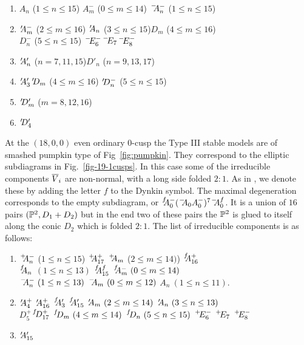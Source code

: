 \documentclass{amsart}
\begin{document}
\begin{enumerate} 
\item[($0$)] $A_n$ ($1\le n\le 15$) \quad $A_m^-$ ($0\le m\le 14$)
  \quad $\mA_n^-$ ($1\le n\le 15$)
\item[($1$)] $\pA_m^-$ ($2\le m\le 16$) \quad
  $\pA_n$ ($3\le n\le 15$)\quad $D_m$ ($4\le m\le 16$) \\
  $D^-_n$ ($5\le n\le 15$)\quad
  $\mE_6^-$\quad $\mE_7$\quad $\mE_8^-$
\item[($1+1$)] $\pA'_n$ ($n=7,11,15$)\quad $D'_n$ ($n=9,13,17$)
\item[($2$)] $\pA'_3$\quad $\pD_m$ ($4\le m\le 16$)\quad
  $\pD_n^-$ ($5\le n\le 15$)
\item[($2+1$)] $\pD'_m$ ($m=8,12,16$)
\item[($3$)] $\pD'_4$
\end{enumerate}

At the $(18,0,0)$ even ordinary $0$-cusp the Type III stable models
are of smashed pumpkin type of Fig~\ref{fig:pumpkin}. %
They
correspond to the elliptic subdiagrams in Fig.~\ref{fig-19-1cusps}. In
this case some of the irreducible components ${\overline V}_i$ are non-normal,
with a long side folded $2:1$. As in \cite[Def.~6.9]{alexeev17ade-surfaces},
we denote these by adding
the letter $f$ to the Dynkin symbol.  The maximal
degeneration corresponds to the empty subdiagram, or
$\foA_0^- (\mA_0 A_0^-)^7 \mA_0^f$.  It is a union of $16$ pairs
$({\mathbb P}^2,D_1+D_2)$ but in the end two of these pairs the ${\mathbb P}^2$ is
glued to itself along the conic $D_2$ which is folded $2:1$.  The list
of irreducible components is as follows:

\begin{enumerate} 
\item[($0$)] $\plA_n^-$ ($1\le n\le 15$) \quad $\plA_{17}^+$ \quad
  $\plA_m$ ($2\le m\le 14)$) \quad $\foA_{16}^+$ \\
  $\foA_n$ $(1\le n\le 13)$ \quad $\foA^f_{15}$ \quad
  $\foA_m^-\ (0\le m\le 14)$ \\
  $\mA_n^-\ (1\le n\le 13)$ \quad $\mA_m\ (0\le m\le 12)$
  \quad $A_n\ (1\le n\le 11)$.   
\item[($1$)] $\pA^+_{4}$ \quad $\pA^+_{16}$ \quad $\foA'_3$ \quad
  $\foA'_{15}$ \quad $\pA_m\ (2\le m\le 14)$ \quad
  $\pA_n\ (3\le n\le 13)$\\
  $D_5^+$\quad $\foD^+_{17}$ \quad $\foD_m\ (4\le m\le 14)$ \quad
  $\foD_n \ (5\le n\le 15)$ \quad $\plE_6^-$ \quad
  $\plE_7$ \quad $\plE_8^-$
\item[($1+1$)] $\pA'_{15}$
\end{enumerate}
\end{document}

